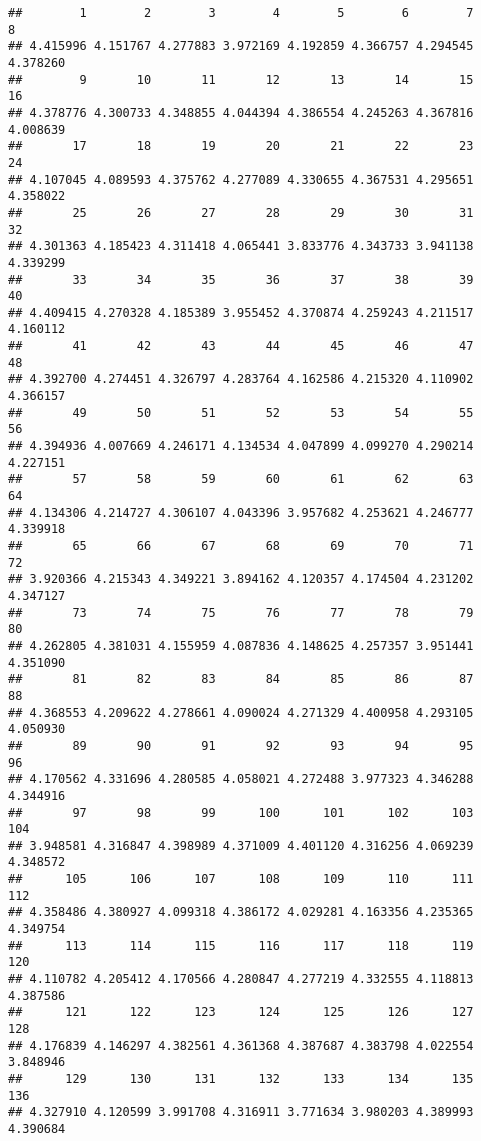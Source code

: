 \documentclass[
]{article}
\begin{document}
\begin{verbatim}
##        1        2        3        4        5        6        7        8 
## 4.415996 4.151767 4.277883 3.972169 4.192859 4.366757 4.294545 4.378260 
##        9       10       11       12       13       14       15       16 
## 4.378776 4.300733 4.348855 4.044394 4.386554 4.245263 4.367816 4.008639 
##       17       18       19       20       21       22       23       24 
## 4.107045 4.089593 4.375762 4.277089 4.330655 4.367531 4.295651 4.358022 
##       25       26       27       28       29       30       31       32 
## 4.301363 4.185423 4.311418 4.065441 3.833776 4.343733 3.941138 4.339299 
##       33       34       35       36       37       38       39       40 
## 4.409415 4.270328 4.185389 3.955452 4.370874 4.259243 4.211517 4.160112 
##       41       42       43       44       45       46       47       48 
## 4.392700 4.274451 4.326797 4.283764 4.162586 4.215320 4.110902 4.366157 
##       49       50       51       52       53       54       55       56 
## 4.394936 4.007669 4.246171 4.134534 4.047899 4.099270 4.290214 4.227151 
##       57       58       59       60       61       62       63       64 
## 4.134306 4.214727 4.306107 4.043396 3.957682 4.253621 4.246777 4.339918 
##       65       66       67       68       69       70       71       72 
## 3.920366 4.215343 4.349221 3.894162 4.120357 4.174504 4.231202 4.347127 
##       73       74       75       76       77       78       79       80 
## 4.262805 4.381031 4.155959 4.087836 4.148625 4.257357 3.951441 4.351090 
##       81       82       83       84       85       86       87       88 
## 4.368553 4.209622 4.278661 4.090024 4.271329 4.400958 4.293105 4.050930 
##       89       90       91       92       93       94       95       96 
## 4.170562 4.331696 4.280585 4.058021 4.272488 3.977323 4.346288 4.344916 
##       97       98       99      100      101      102      103      104 
## 3.948581 4.316847 4.398989 4.371009 4.401120 4.316256 4.069239 4.348572 
##      105      106      107      108      109      110      111      112 
## 4.358486 4.380927 4.099318 4.386172 4.029281 4.163356 4.235365 4.349754 
##      113      114      115      116      117      118      119      120 
## 4.110782 4.205412 4.170566 4.280847 4.277219 4.332555 4.118813 4.387586 
##      121      122      123      124      125      126      127      128 
## 4.176839 4.146297 4.382561 4.361368 4.387687 4.383798 4.022554 3.848946 
##      129      130      131      132      133      134      135      136 
## 4.327910 4.120599 3.991708 4.316911 3.771634 3.980203 4.389993 4.390684 

\end{verbatim}
\end{document}
